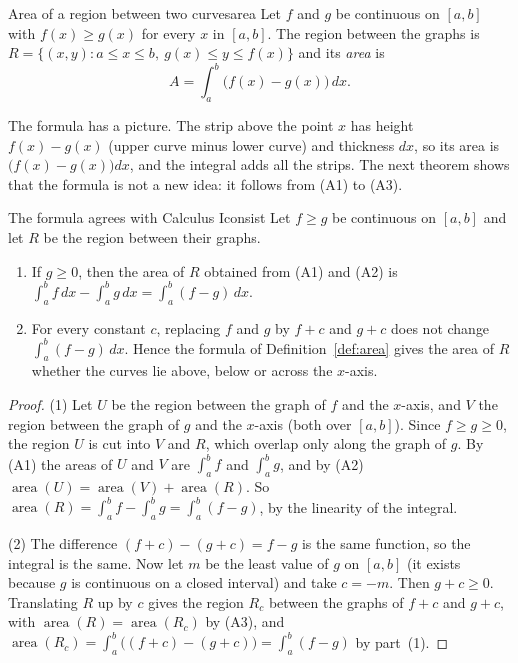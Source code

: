 \documentclass[11pt]{article}
\begin{document}
\begin{defn}{Area of a region between two curves}{area}
Let $f$ and $g$ be continuous on $[a,b]$ with $f(x)\ge g(x)$ for every $x$ in $[a,b]$. The region between the graphs is $R=\{(x,y):a\le x\le b,\ g(x)\le y\le f(x)\}$ and its \emph{area} is
\[
A=\int_a^b\bigl(f(x)-g(x)\bigr)\,dx .
\]
\end{defn}

The formula has a picture. The strip above the point $x$ has height $f(x)-g(x)$ (upper curve minus lower curve) and thickness $dx$, so its area is $\bigl(f(x)-g(x)\bigr)dx$, and the integral adds all the strips. The next theorem shows that the formula is not a new idea: it follows from (A1) to (A3).

\begin{thm}{The formula agrees with Calculus I}{consist}
Let $f\ge g$ be continuous on $[a,b]$ and let $R$ be the region between their graphs.
\begin{enumerate}[label=(\arabic*),nosep]
  \item If $g\ge0$, then the area of $R$ obtained from (A1) and (A2) is $\int_a^bf\,dx-\int_a^bg\,dx=\int_a^b(f-g)\,dx$.
  \item For every constant $c$, replacing $f$ and $g$ by $f+c$ and $g+c$ does not change $\int_a^b(f-g)\,dx$. Hence the formula of Definition~\ref{def:area} gives the area of $R$ whether the curves lie above, below or across the $x$-axis.
\end{enumerate}
\end{thm}
\begin{proof}
(1) Let $U$ be the region between the graph of $f$ and the $x$-axis, and $V$ the region between the graph of $g$ and the $x$-axis (both over $[a,b]$). Since $f\ge g\ge0$, the region $U$ is cut into $V$ and $R$, which overlap only along the graph of $g$. By (A1) the areas of $U$ and $V$ are $\int_a^bf$ and $\int_a^bg$, and by (A2) $\operatorname{area}(U)=\operatorname{area}(V)+\operatorname{area}(R)$. So $\operatorname{area}(R)=\int_a^bf-\int_a^bg=\int_a^b(f-g)$, by the linearity of the integral.

(2) The difference $(f+c)-(g+c)=f-g$ is the same function, so the integral is the same. Now let $m$ be the least value of $g$ on $[a,b]$ (it exists because $g$ is continuous on a closed interval) and take $c=-m$. Then $g+c\ge0$. Translating $R$ up by $c$ gives the region $R_c$ between the graphs of $f+c$ and $g+c$, with $\operatorname{area}(R)=\operatorname{area}(R_c)$ by (A3), and $\operatorname{area}(R_c)=\int_a^b\bigl((f+c)-(g+c)\bigr)=\int_a^b(f-g)$ by part~(1).
\end{proof}
\end{document}
